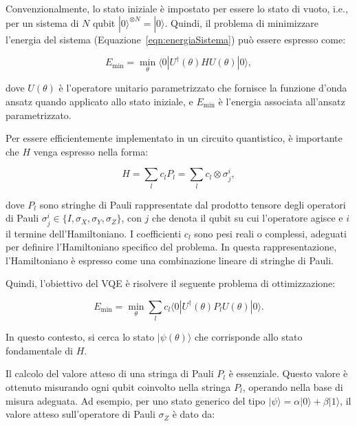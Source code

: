 Convenzionalmente, lo stato iniziale è impostato per essere lo stato di vuoto, i.e., 
per un sistema di $N$ qubit $|0\rangle^{\otimes N} = |0\rangle$. 
Quindi, il problema di minimizzare l'energia del sistema (Equazione~\ref{eqn:energiaSistema}) 
può essere espresso come:

\begin{equation}
    E_{\min} = \min_{\theta} \langle 0|U^{\dagger}(\theta)HU(\theta)|0\rangle,
\end{equation}

dove $U(\theta)$ è l'operatore unitario parametrizzato che fornisce la funzione 
d'onda ansatz quando applicato allo stato iniziale, e $E_{\min}$ è l'energia 
associata all'ansatz parametrizzato.

Per essere efficientemente implementato in un circuito quantistico, è importante
che $H$ venga espresso nella forma:

\begin{equation}
    H = \sum_{l} c_l P_l = \sum_{l} c_l \otimes \sigma_j^i,
\end{equation}

dove \(P_l\) sono stringhe di Pauli rappresentate dal prodotto tensore degli 
operatori di Pauli \(\sigma_j^i \in \{I, \sigma_X, \sigma_Y, \sigma_Z\}\), 
con \(j\) che denota il qubit su cui l'operatore agisce e \(i\) il termine 
dell'Hamiltoniano. I coefficienti \(c_l\) sono pesi reali o complessi, 
adeguati per definire l'Hamiltoniano specifico del problema. In questa 
rappresentazione, l'Hamiltoniano è espresso come una combinazione lineare 
di stringhe di Pauli.

Quindi, l'obiettivo del VQE è risolvere il seguente problema di ottimizzazione:

\begin{equation}
    E_{\text{min}} = \min_\theta \sum_{l} c_l \langle 0 | U^\dagger(\theta) P_l U(\theta) | 0 \rangle.
\end{equation}

In questo contesto, si cerca lo stato \(|\psi(\theta)\rangle\) che corrisponde 
allo stato fondamentale di \(H\).

Il calcolo del valore atteso di una stringa di Pauli \(P_l\) è essenziale. 
Questo valore è ottenuto misurando ogni qubit coinvolto nella stringa \(P_l\), 
operando nella base di misura adeguata. Ad esempio, per uno stato generico del 
tipo \(|\psi\rangle = \alpha |0\rangle + \beta |1\rangle\), il valore atteso 
sull'operatore di Pauli \(\sigma_Z\) è dato da:

